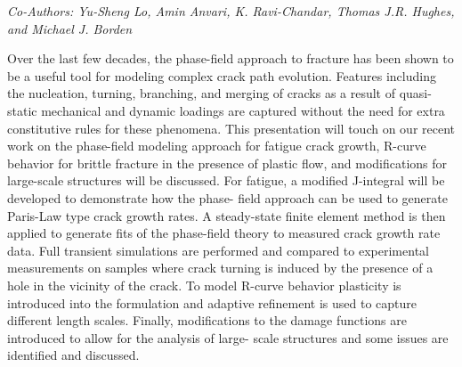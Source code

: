 \begin{center}
\textit{Co-Authors: Yu-Sheng Lo, Amin Anvari, K. Ravi-Chandar, Thomas J.R. Hughes, and
Michael J. Borden}
\end{center} 
Over the last few decades, the phase-field approach to fracture has been shown to be a useful tool
for modeling complex crack path evolution. Features including the nucleation, turning, branching,
and merging of cracks as a result of quasi-static mechanical and dynamic loadings are captured
without the need for extra constitutive rules for these phenomena. This presentation will touch on
our recent work on the phase-field modeling approach for fatigue crack growth, R-curve behavior
for brittle fracture in the presence of plastic flow, and modifications for large-scale structures will
be discussed. For fatigue, a modified J-integral will be developed to demonstrate how the phase-
field approach can be used to generate Paris-Law type crack growth rates. A steady-state finite
element method is then applied to generate fits of the phase-field theory to measured crack growth
rate data. Full transient simulations are performed and compared to experimental measurements on
samples where crack turning is induced by the presence of a hole in the vicinity of the crack. To
model R-curve behavior plasticity is introduced into the formulation and adaptive refinement is used
to capture different length scales. Finally, modifications to the damage functions are introduced to
allow for the analysis of large- scale structures and some issues are identified and discussed.
